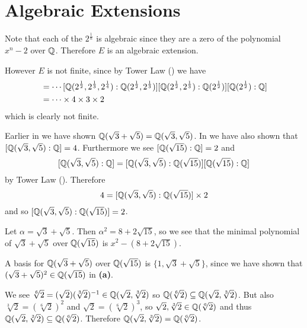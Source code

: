 \section{Algebraic Extensions}
\begin{questions}
    \item Note that each of the $2^{\frac1n}$ is algebraic since they are a zero of the polynomial $x^n - 2$ over $\mathbb{Q}$. Therefore $E$ is an algebraic extension.

    However $E$ is not finite, since by Tower Law () we have
    \begin{align*}
        [E: F] &= \cdots[\Q(2^{\frac12},2^{\frac13},2^{\frac14}):\Q(2^{\frac12},2^{\frac13})]
        [\Q(2^{\frac12},2^{\frac13}):\Q(2^{\frac12})][\Q(2^{\frac12}):\Q]\\
        &= \cdots \times 4 \times 3 \times 2
    \end{align*}
    which is clearly not finite.

    \item Earlier in  we have shown $\mathbb{Q}(\sqrt3 + \sqrt5) = \mathbb{Q}(\sqrt3,\sqrt5)$. In  we have also shown that $[\mathbb{Q}(\sqrt3,\sqrt5):\mathbb{Q}] = 4$. Furthermore we see $[\mathbb{Q}(\sqrt{15}):\mathbb{Q}] = 2$ and
    \[
        [\mathbb{Q}(\sqrt3,\sqrt5):\mathbb{Q}] = [\mathbb{Q}(\sqrt3,\sqrt5):\mathbb{Q}(\sqrt{15})][\mathbb{Q}(\sqrt{15}):\mathbb{Q}]
    \]
    by Tower Law (). Therefore
    \[
        4 = [\mathbb{Q}(\sqrt3,\sqrt5):\mathbb{Q}(\sqrt{15})]\times2
    \]
    and so $[\mathbb{Q}(\sqrt3,\sqrt5):\mathbb{Q}(\sqrt{15})] = 2$.

    \begin{partquestions}{\alph*}
        \item Let $\alpha = \sqrt3 + \sqrt5$. Then $\alpha^2 = 8 + 2\sqrt{15}$, so we see that the minimal polynomial of $\sqrt3+\sqrt5$ over $\mathbb{Q}(\sqrt{15})$ is $x^2 - (8 + 2\sqrt{15})$.

        \item A basis for $\mathbb{Q}(\sqrt3 + \sqrt5)$ over $\mathbb{Q}(\sqrt{15})$ is $\{1, \sqrt3 + \sqrt5\}$, since we have shown that $(\sqrt3 + \sqrt5)^2 \in \mathbb{Q}(\sqrt{15})$ in \textbf{(a)}.
    \end{partquestions}

    \item We see $\sqrt[6]2 = (\sqrt2)(\sqrt[3]2)^{-1} \in \mathbb{Q}(\sqrt2, \sqrt[3]2)$ so $\mathbb{Q}(\sqrt[6]2) \subseteq \mathbb{Q}(\sqrt2,\sqrt[3]2)$. But also $\sqrt[3]2 = \left(\sqrt[6]2\right)^2$ and $\sqrt2 = \left(\sqrt[6]2\right)^3$, so $\sqrt2,\sqrt[3]2 \in \mathbb{Q}(\sqrt[6]2)$ and thus $\mathbb{Q}(\sqrt2,\sqrt[3]2) \subseteq \mathbb{Q}(\sqrt[6]2)$. Therefore $\mathbb{Q}(\sqrt2,\sqrt[3]2) = \mathbb{Q}(\sqrt[6]2)$.


\end{questions}
